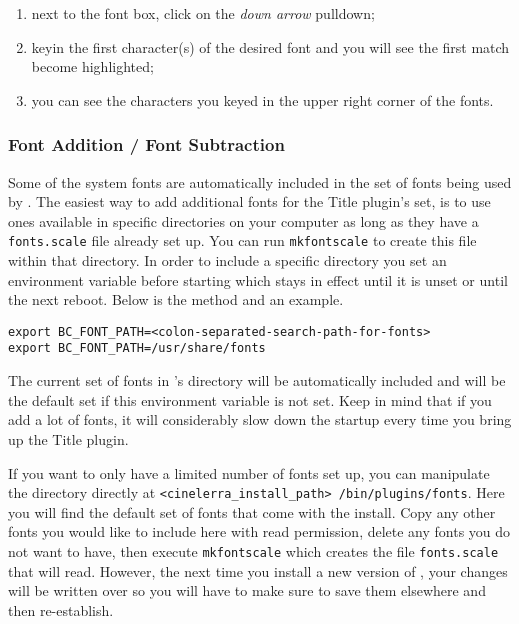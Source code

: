\begin{enumerate}
    \item next to the font box, click on the \textit{down arrow} pulldown;
    \item keyin the first character(s) of the desired font and you will see the first match become highlighted;
    \item you can see the characters you keyed in the upper right corner of the fonts.
\end{enumerate}

\subsubsection*{Font Addition / Font Subtraction}%
\label{ssub:font_addition_subtraction}

Some of the system fonts are automatically included in the set of fonts being used by \CGG{}. The easiest way to add additional fonts for the Title plugin's set, is to use ones available in specific directories on your computer as long as they have a \texttt{fonts.scale} file already set up. You can run \texttt{mkfontscale} to create this file within that directory. In order to include a specific directory you set an environment variable before starting \CGG{} which stays in effect until it is unset or until the next reboot. Below is the method and an example.

\vspace{1ex}
\begin{lstlisting}[style=sh]
export BC_FONT_PATH=<colon-separated-search-path-for-fonts>
export BC_FONT_PATH=/usr/share/fonts
\end{lstlisting}

The current set of fonts in \CGG{}'s directory will be automatically included and will be the default set if this environment variable is not set. Keep in mind that if you add a lot of fonts, it will considerably slow down the startup every time you bring up the Title plugin.

If you want to only have a limited number of fonts set up, you can manipulate the \CGG{} directory directly at \texttt{<cinelerra\_install\_path> /bin/plug\-ins/fonts}.
Here you will find the default set of fonts that come with the install. Copy any other fonts you would like to include here with read permission, delete any fonts you do not want to have, then execute \texttt{mkfontscale} which creates the file \texttt{fonts.scale} that \CGG{} will read. However, the next time you install a new version of \CGG{}, your changes will be written over so you will have to make sure to save them elsewhere and then re-establish.

